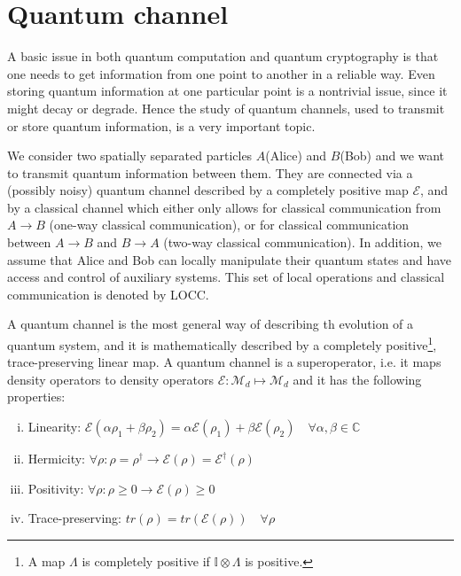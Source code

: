 \documentclass[10pt,a4paper]{book}
\numberwithin{equation}{chapter}
\numberwithin{figure}{chapter}
\numberwithin{table}{chapter}
\begin{document}
\section{Quantum channel}
A basic issue in both quantum computation and quantum cryptography is that one needs to get information from one point to another in a reliable way. Even storing quantum information at one particular point is a nontrivial issue, since it might decay or degrade. Hence the study of quantum channels, used to transmit or store quantum information, is a very important topic.

We consider two spatially separated particles $A$(Alice) and $B$(Bob) and we want to transmit quantum information between them. They are connected via a (possibly noisy) quantum channel described by a completely positive map $\mathcal{E}$, and by a classical channel which either only allows for classical communication from $A\rightarrow B$ (one-way classical communication), or for classical communication between $A\rightarrow B$ and $B\rightarrow A$ (two-way classical communication). In addition, we assume that Alice and Bob can locally manipulate their quantum states and have access and control of auxiliary systems. This set of local operations and classical communication is denoted by LOCC. 

A quantum channel is the most general way of describing th evolution of a quantum system, and it is mathematically described by a completely positive\footnote{A map $\Lambda$ is completely positive if $\mathbb{I}\otimes \Lambda$ is positive.}, trace-preserving linear map. A quantum channel is a superoperator, i.e. it maps density operators to density operators $\mathcal{E}: \mathcal{M}_d \longmapsto \mathcal{M}_d$ and it has the following properties:
\begin{enumerate}[(i)]
\item Linearity: $\mathcal{E}(\alpha \rho_1 + \beta \rho_2)= \alpha \mathcal{E}(\rho_1) + \beta \mathcal{E}(\rho_2) \quad \forall \alpha , \beta \in \mathbb{C}$
\item Hermicity: $\forall \rho :\rho=\rho^{\dagger} \longrightarrow \mathcal{E}(\rho)=\mathcal{E}^{\dagger}(\rho)$
\item Positivity: $\forall \rho :\rho \geq 0 \longrightarrow \mathcal{E}(\rho) \geq 0$
\item Trace-preserving: $tr(\rho)=tr(\mathcal{E}(\rho)) \quad \forall \rho$
\end{enumerate}
\end{document}
